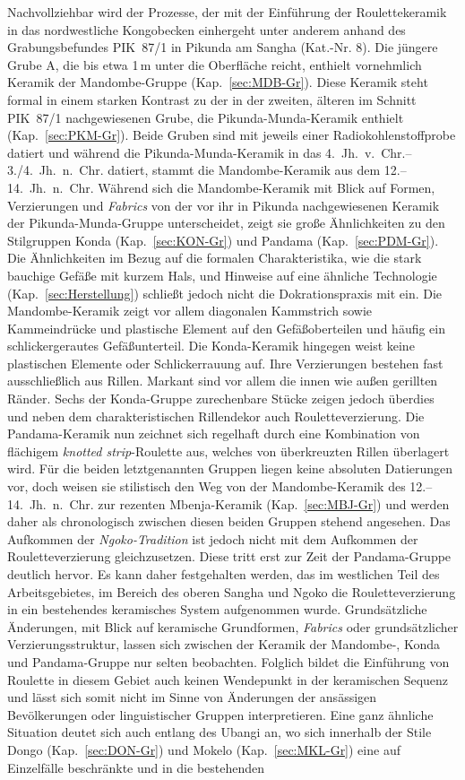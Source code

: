 Nachvollziehbar wird der Prozesse, der mit der Einführung der Roulettekeramik in das nordwestliche Kongobecken einhergeht unter anderem anhand des Grabungsbefundes PIK~87/1 in Pikunda am Sangha (Kat.-Nr. 8). Die jüngere Grube A, die bis etwa 1\,m unter die Oberfläche reicht, enthielt vornehmlich Keramik der Mandombe-Gruppe (Kap.~\ref{sec:MDB-Gr}). Diese Keramik steht formal in einem starken Kontrast zu der in der zweiten, älteren im Schnitt PIK~87/1 nachgewiesenen Grube, die Pikunda-Munda-Keramik enthielt (Kap.~\ref{sec:PKM-Gr}). Beide Gruben sind mit jeweils einer Radiokohlenstoffprobe datiert und während die Pikunda-Munda-Keramik in das 4.~Jh.~v.~Chr.--3./4.~Jh.~n.~Chr. datiert, stammt die Mandombe-Keramik aus dem 12.--14.~Jh.~n.~Chr. Während sich die Mandombe-Keramik mit Blick auf Formen, Verzierungen und \textit{Fabrics} von der vor ihr in Pikunda nachgewiesenen Keramik der Pikunda-Munda-Gruppe unterscheidet, zeigt sie große Ähnlichkeiten zu den Stilgruppen Konda (Kap.~\ref{sec:KON-Gr}) und Pandama (Kap.~\ref{sec:PDM-Gr}). Die Ähnlichkeiten im Bezug auf die formalen Charakteristika, wie die stark bauchige Gefäße mit kurzem Hals, und Hinweise auf eine ähnliche Technologie (Kap.~\ref{sec:Herstellung}) schließt jedoch nicht die Dokrationspraxis mit ein. Die Mandombe-Keramik zeigt vor allem diagonalen Kammstrich sowie Kammeindrücke und plastische Element auf den Gefäßoberteilen und häufig ein schlickergerautes Gefäßunterteil. Die Konda-Keramik hingegen weist keine plastischen Elemente oder Schlickerrauung auf. Ihre Verzierungen bestehen fast ausschließlich aus Rillen. Markant sind vor allem die innen wie außen gerillten Ränder. Sechs der Konda-Gruppe zurechenbare Stücke zeigen jedoch überdies und neben dem charakteristischen Rillendekor auch Rouletteverzierung. Die Pandama-Keramik nun zeichnet sich regelhaft durch eine Kombination von flächigem \textit{knotted strip}-Roulette aus, welches von überkreuzten Rillen überlagert wird. Für die beiden letztgenannten Gruppen liegen keine absoluten Datierungen vor, doch weisen sie stilistisch den Weg von der Mandombe-Keramik des 12.--14.~Jh.~n.~Chr. zur rezenten Mbenja-Keramik (Kap.~\ref{sec:MBJ-Gr}) und werden daher als chronologisch zwischen diesen beiden Gruppen stehend angesehen. Das Aufkommen der \textit{Ngoko-Tradition} ist jedoch nicht mit dem Aufkommen der Rouletteverzierung gleichzusetzen. Diese tritt erst zur Zeit der Pandama-Gruppe deutlich hervor. Es kann daher festgehalten werden, das im westlichen Teil des Arbeitsgebietes, im Bereich des oberen Sangha und Ngoko die Rouletteverzierung in ein bestehendes keramisches System aufgenommen wurde. Grundsätzliche Änderungen, mit Blick auf keramische Grundformen, \textit{Fabrics} oder grundsätzlicher Verzierungsstruktur, lassen sich zwischen der Keramik der Mandombe-, Konda und Pandama-Gruppe nur selten beobachten. Folglich bildet die Einführung von Roulette in diesem Gebiet auch keinen Wendepunkt in der keramischen Sequenz und lässt sich somit nicht im Sinne von Änderungen der ansässigen Bevölkerungen oder linguistischer Gruppen interpretieren. Eine ganz ähnliche Situation deutet sich auch entlang des Ubangi an, wo sich innerhalb der Stile Dongo (Kap.~\ref{sec:DON-Gr}) und Mokelo (Kap.~\ref{sec:MKL-Gr}) eine auf Einzelfälle beschränkte und in die bestehenden 